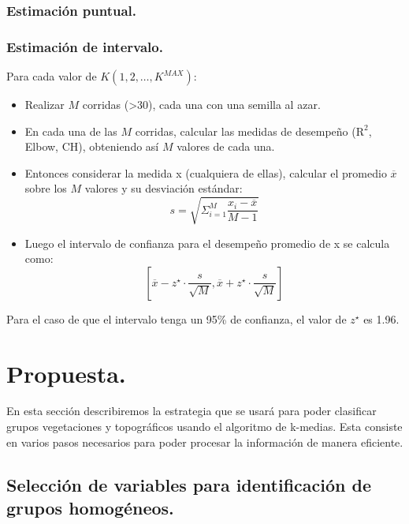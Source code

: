 \documentclass[]{article}
\providecommand{\tightlist}{%
  \setlength{\itemsep}{0pt}\setlength{\parskip}{0pt}}
\begin{document}
\subsubsection{Estimación puntual.}\label{estimacion-puntual.}

\subsubsection{Estimación de intervalo.}\label{estimacion-de-intervalo.}

Para cada valor de \(K (1, 2, \ldots, K^{MAX})\):

\begin{itemize}
\tightlist
\item
  Realizar \(M\) corridas (\textgreater{}30), cada una con una semilla
  al azar.
\item
  En cada una de las \(M\) corridas, calcular las medidas de desempeño
  (\(\text{R}^2\), Elbow, CH), obteniendo así \(M\) valores de cada una.
\item
  Entonces considerar la medida x (cualquiera de ellas), calcular el
  promedio \(\overline{x}\) sobre los \(M\) valores y su desviación
  estándar: \[s = \sqrt{\Sigma_{i=1}^M \frac{x_i-\overline{x}}{M-1} }\]
\item
  Luego el intervalo de confianza para el desempeño promedio de x se
  calcula como:
  \[\left[\overline{x} - z^\star \cdot \frac{s}{\sqrt{M}} , \overline{x} +
    z^\star \cdot \frac{s}{\sqrt{M}}\right]\]
\end{itemize}

Para el caso de que el intervalo tenga un 95\% de confianza, el valor de
\textbf{$z^\star$} es 1.96.

\clearpage

\section{Propuesta.}\label{propuesta.}

En esta sección describiremos la estrategia que se usará para poder
clasificar grupos vegetaciones y topográficos usando el algoritmo de
k-medias. Esta consiste en varios pasos necesarios para poder procesar
la información de manera eficiente.

\subsection{Selección de variables para identificación de grupos
homogéneos.}\label{seleccion-de-variables-para-identificacion-de-grupos-homogeneos.}
\end{document}
